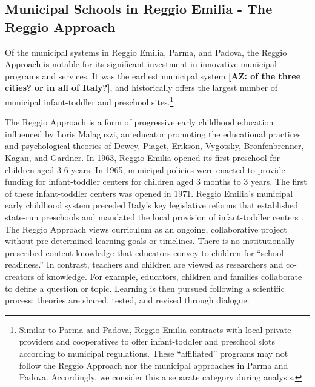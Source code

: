 
\subsection{Municipal Schools in Reggio Emilia - The Reggio Approach}

Of the municipal systems in Reggio Emilia, Parma, and Padova, the Reggio Approach is notable for its significant investment in innovative municipal programs and services. It was the earliest municipal system \textbf{[AZ: of the three cities? or in all of Italy?]}, and historically offers the largest number of municipal infant-toddler and preschool sites.\footnote{Similar to Parma and Padova, Reggio Emilia contracts with local private providers and cooperatives to offer infant-toddler and preschool slots according to municipal regulations. These ``affiliated'' programs may not follow the Reggio Approach nor the municipal approaches in Parma and Padova. Accordingly, we consider this a separate category during analysis.} 


The Reggio Approach is a form of progressive early childhood education influenced by Loris Malaguzzi, an educator promoting the educational practices and psychological theories of Dewey, Piaget, Erikson, Vygotsky, Bronfenbrenner, Kagan, and Gardner. In 1963, Reggio Emilia opened its first preschool for children aged 3-6 years. In 1965, municipal policies were enacted to provide funding for infant-toddler centers for children aged 3 months to 3 years. The first of these infant-toddler centers was opened in 1971. Reggio Emilia's municipal early childhood system preceded Italy's key legislative reforms that established state-run preschools and mandated the local provision of infant-toddler centers \citep{Cagliari-etal-eds_2016_BOOK_Loris-Malaguzzi}. The Reggio Approach views curriculum as an ongoing, collaborative project without pre-determined learning goals or timelines. There is no institutionally-prescribed content knowledge that educators convey to children for ``school readiness.'' In contrast, teachers and children are viewed as researchers and co-creators of knowledge. For example, educators, children and families collaborate to define a question or topic. Learning is then pursued following a scientific process: theories are shared, tested, and revised through dialogue. 

